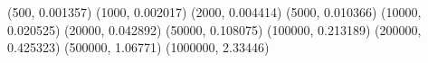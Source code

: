(500, 0.001357) (1000, 0.002017) (2000, 0.004414) (5000, 0.010366) (10000, 0.020525) (20000, 0.042892) (50000, 0.108075) (100000, 0.213189) (200000, 0.425323) (500000, 1.06771) (1000000, 2.33446) 